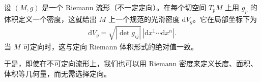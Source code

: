 \documentclass[../../main.tex]{subfiles}
\begin{document}
\begin{proposition}[Riemann 密度]\label{proposition:ch16-riemannian-density-form}
设 $(M,g)$ 是一个 Riemann 流形（不一定定向）。在每个切空间 $T_pM$ 上用 $g_p$ 的体积定义一个密度，这就给出 $M$ 上一个规范的光滑密度 $\mathrm{d}V_g$。它在局部坐标下为
\begin{align*}
\mathrm{d}V_g=\sqrt{|\det g_{ij}|}\,|\mathrm{d}x^1\cdots\mathrm{d}x^n|.
\end{align*}
当 $M$ 可定向时，这与定向 Riemann 体积形式的绝对值一致。
\end{proposition}

于是，即使在不可定向流形上，我们也可以用 Riemann 密度来定义长度、面积、体积等几何量，而无需选择定向。
\end{document}
